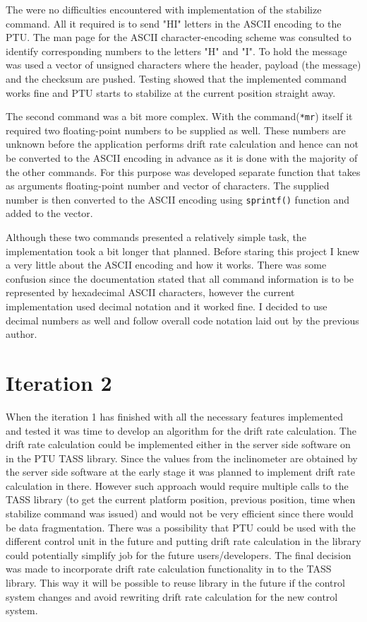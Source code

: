 The were no difficulties encountered with implementation of the stabilize command. All it required is to send "HI" letters in the ASCII encoding to the PTU. The man page for the ASCII character-encoding scheme was consulted to identify corresponding numbers to the letters "H" and "I". To hold the message was used a vector of unsigned characters where the header, payload (the message) and the checksum are pushed. Testing showed that the implemented command works fine and PTU starts to stabilize at the current position straight away. 

The second command was a bit more complex. With the command(\texttt{*mr}) itself it required two floating-point numbers to be supplied as well. These numbers are unknown before the application performs drift rate calculation and hence can not be converted to the ASCII encoding in advance as it is done with the majority of the other commands. For this purpose was developed separate function that takes as arguments floating-point number and vector of characters. The supplied number is then converted to the ASCII encoding using \texttt{sprintf()} function and added to the vector. 

Although these two commands presented a relatively simple task, the implementation took a bit longer that planned. Before staring this project I knew a very little about the ASCII encoding and how it works. There was some confusion since the documentation stated that all command information is to be represented by hexadecimal ASCII characters, however the current implementation used decimal notation and it worked fine. I decided to use decimal numbers as well and follow overall code notation laid out by the previous author.   
 
\section{Iteration 2}
When the iteration 1 has finished with all the necessary features implemented and tested it was time to develop an algorithm for the drift rate calculation. The drift rate calculation could be implemented either in the server side software on in the PTU TASS library. Since the values from the inclinometer are obtained by the server side software at the early stage it was planned to implement drift rate calculation in there. However such approach would require multiple calls to the TASS library (to get the current platform position, previous position, time when stabilize command was issued) and would not be very efficient since there would be data fragmentation. There was a possibility that PTU could be used with the different control unit in the future and putting drift rate calculation in the library could potentially simplify job for the future users/developers. The final decision was made to incorporate drift rate calculation functionality in to the TASS library. This way it will be possible to reuse library in the future if the control system changes and avoid rewriting drift rate calculation for the new control system.    


